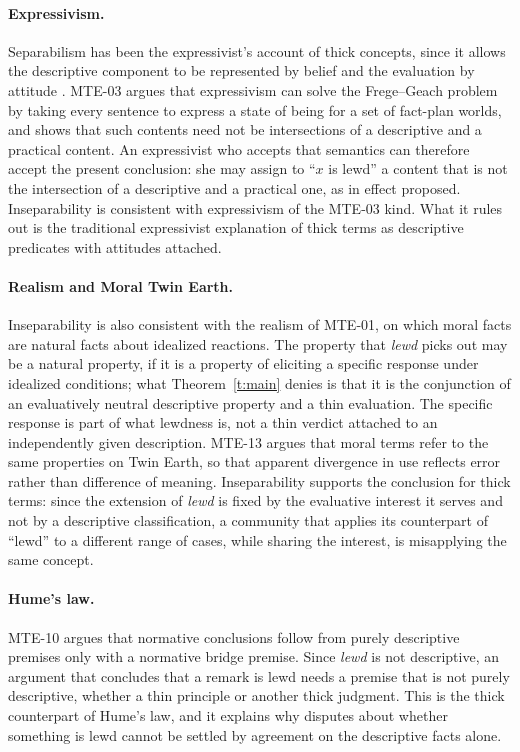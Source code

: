 \documentclass{situationist-preprint}
\begin{document}
\paragraph{Expressivism.} Separabilism has been the expressivist's account of thick concepts, since it allows the descriptive component to be represented by belief and the evaluation by attitude \citep{Blackburn1992}. MTE-03 argues that expressivism can solve the Frege--Geach problem by taking every sentence to express a state of being for a set of fact-plan worlds, and shows that such contents need not be intersections of a descriptive and a practical content. An expressivist who accepts that semantics can therefore accept the present conclusion: she may assign to \enquote{$x$ is lewd} a content that is not the intersection of a descriptive and a practical one, as \citet{Gibbard1992} in effect proposed. Inseparability is consistent with expressivism of the MTE-03 kind. What it rules out is the traditional expressivist explanation of thick terms as descriptive predicates with attitudes attached.

\paragraph{Realism and Moral Twin Earth.} Inseparability is also consistent with the realism of MTE-01, on which moral facts are natural facts about idealized reactions. The property that \emph{lewd} picks out may be a natural property, if it is a property of eliciting a specific response under idealized conditions; what Theorem~\ref{t:main} denies is that it is the conjunction of an evaluatively neutral descriptive property and a thin evaluation. The specific response is part of what lewdness is, not a thin verdict attached to an independently given description. MTE-13 argues that moral terms refer to the same properties on Twin Earth, so that apparent divergence in use reflects error rather than difference of meaning. Inseparability supports the conclusion for thick terms: since the extension of \emph{lewd} is fixed by the evaluative interest it serves and not by a descriptive classification, a community that applies its counterpart of \enquote{lewd} to a different range of cases, while sharing the interest, is misapplying the same concept.

\paragraph{Hume's law.} MTE-10 argues that normative conclusions follow from purely descriptive premises only with a normative bridge premise. Since \emph{lewd} is not descriptive, an argument that concludes that a remark is lewd needs a premise that is not purely descriptive, whether a thin principle or another thick judgment. This is the thick counterpart of Hume's law, and it explains why disputes about whether something is lewd cannot be settled by agreement on the descriptive facts alone.
\end{document}
